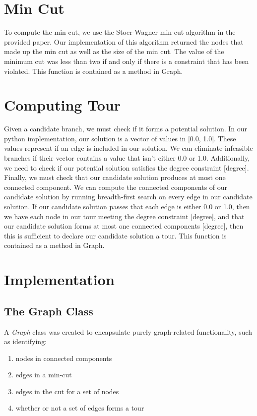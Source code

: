 \documentclass{article}
\begin{document}
\section{Min Cut}
To compute the min cut,
we use the Stoer-Wagner min-cut algorithm
in the provided paper.
Our implementation of this algorithm
returned the nodes that made up the min cut
as well as the size of the min cut.
The value of the minimum cut
was less than two
if and only if
there is a constraint that has been violated.
This function is contained as a method in Graph.

\section{Computing Tour}
Given a candidate branch,
we must check if it forms a potential solution.
In our python implementation,
our solution is a vector of values in [0.0, 1.0].
These values represent
if an edge is included in our solution.
We can eliminate infeasible branches
if their vector contains a value
that isn’t either 0.0 or 1.0.
Additionally, we need to check
if our potential solution satisfies
the degree constraint [degree].
Finally, we must check
that our candidate solution produces
at most one connected component.
We can compute the connected components
of our candidate solution
by running breadth-first search
on every edge in our candidate solution.
If our candidate solution passes
that each edge is either 0.0 or 1.0,
then we have each node in our tour
meeting the degree constraint [degree],
and that our candidate solution
forms at most one connected components [degree],
then this is sufficient to declare
our candidate solution a tour.
This function is contained as a method in Graph.

\section{Implementation}

\subsection{The Graph Class}

A \textit{Graph} class was created
to encapsulate purely graph-related functionality,
such as identifying:
\begin{enumerate}
\item nodes in connected components
\item edges in a min-cut
\item edges in the cut for a set of nodes
\item whether or not a set of edges forms a tour
\end{enumerate}
\end{document}
